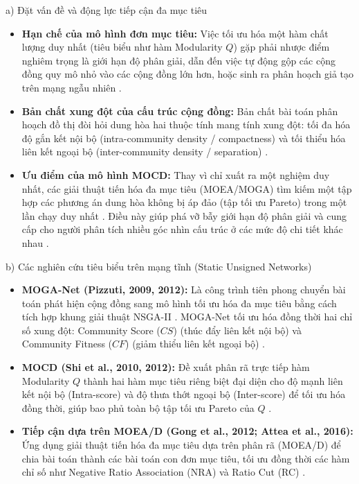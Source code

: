 \documentclass[14pt,a4paper]{extarticle}
\begin{document}
\noindent a) Đặt vấn đề và động lực tiếp cận đa mục tiêu
\begin{itemize}
    \item \textbf{Hạn chế của mô hình đơn mục tiêu:} Việc tối ưu hóa một hàm chất lượng duy nhất (tiêu biểu như hàm Modularity $Q$) gặp phải nhược điểm nghiêm trọng là giới hạn độ phân giải, dẫn đến việc tự động gộp các cộng đồng quy mô nhỏ vào các cộng đồng lớn hơn, hoặc sinh ra phân hoạch giả tạo trên mạng ngẫu nhiên \cite{Gong2016}.
    \item \textbf{Bản chất xung đột của cấu trúc cộng đồng:} Bản chất bài toán phân hoạch đồ thị đòi hỏi dung hòa hai thuộc tính mang tính xung đột: tối đa hóa độ gắn kết nội bộ (intra-community density / compactness) và tối thiểu hóa liên kết ngoại bộ (inter-community density / separation) \cite{Baraa2021}.
    \item \textbf{Ưu điểm của mô hình MOCD:} Thay vì chỉ xuất ra một nghiệm duy nhất, các giải thuật tiến hóa đa mục tiêu (MOEA/MOGA) tìm kiếm một tập hợp các phương án dung hòa không bị áp đảo (tập tối ưu Pareto) trong một lần chạy duy nhất \cite{Baraa2021}. Điều này giúp phá vỡ bẫy giới hạn độ phân giải và cung cấp cho người phân tích nhiều góc nhìn cấu trúc ở các mức độ chi tiết khác nhau \cite{Baraa2021, Gong2016}.
\end{itemize}

\noindent b) Các nghiên cứu tiêu biểu trên mạng tĩnh (Static Unsigned Networks)
\begin{itemize}
    \item \textbf{MOGA-Net (Pizzuti, 2009, 2012):} Là công trình tiên phong chuyển bài toán phát hiện cộng đồng sang mô hình tối ưu hóa đa mục tiêu bằng cách tích hợp khung giải thuật NSGA-II \cite{Baraa2021}. MOGA-Net tối ưu hóa đồng thời hai chỉ số xung đột: Community Score ($CS$) (thúc đẩy liên kết nội bộ) và Community Fitness ($CF$) (giảm thiểu liên kết ngoại bộ) \cite{Baraa2021, Gong2016}.
    \item \textbf{MOCD (Shi et al., 2010, 2012):} Đề xuất phân rã trực tiếp hàm Modularity $Q$ thành hai hàm mục tiêu riêng biệt đại diện cho độ mạnh liên kết nội bộ (Intra-score) và độ thưa thớt ngoại bộ (Inter-score) để tối ưu hóa đồng thời, giúp bao phủ toàn bộ tập tối ưu Pareto của $Q$ \cite{Baraa2021}.
    \item \textbf{Tiếp cận dựa trên MOEA/D (Gong et al., 2012; Attea et al., 2016):} Ứng dụng giải thuật tiến hóa đa mục tiêu dựa trên phân rã (MOEA/D) để chia bài toán thành các bài toán con đơn mục tiêu, tối ưu đồng thời các hàm chỉ số như Negative Ratio Association (NRA) và Ratio Cut (RC) \cite{Baraa2021, Gong2016}.
\end{itemize}
\end{document}
